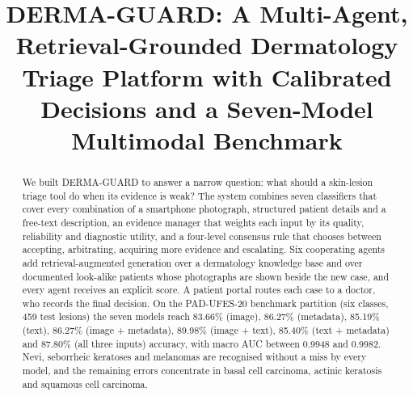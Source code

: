 \documentclass[conference]{IEEEtran}
\begin{document}
\title{DERMA-GUARD: A Multi-Agent, Retrieval-Grounded Dermatology Triage Platform with Calibrated Decisions and a Seven-Model Multimodal Benchmark}

\author{
\and
{}
\and
{}
\and
{}
}

\maketitle

\begin{abstract}
We built DERMA-GUARD to answer a narrow question: what should a skin-lesion triage tool do when its evidence is weak? The system combines seven classifiers that cover every combination of a smartphone photograph, structured patient details and a free-text description, an evidence manager that weights each input by its quality, reliability and diagnostic utility, and a four-level consensus rule that chooses between accepting, arbitrating, acquiring more evidence and escalating. Six cooperating agents add retrieval-augmented generation over a dermatology knowledge base and over documented look-alike patients whose photographs are shown beside the new case, and every agent receives an explicit score. A patient portal routes each case to a doctor, who records the final decision. On the PAD-UFES-20 benchmark partition (six classes, 459 test lesions) the seven models reach 83.66\% (image), 86.27\% (metadata), 85.19\% (text), 86.27\% (image + metadata), 89.98\% (image + text), 85.40\% (text + metadata) and 87.80\% (all three inputs) accuracy, with macro AUC between 0.9948 and 0.9982. Nevi, seborrheic keratoses and melanomas are recognised without a miss by every model, and the remaining errors concentrate in basal cell carcinoma, actinic keratosis and squamous cell carcinoma.
\end{abstract}
\end{document}
